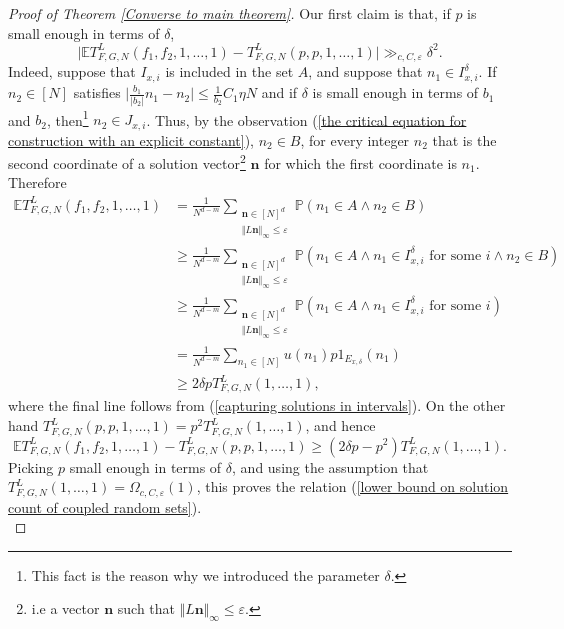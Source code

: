 \documentclass[12pt,a4paper,twoside,reqno]{amsart}
\numberwithin{equation}{section}
\begin{document}
\begin{proof}[Proof of Theorem \ref{Converse to main theorem}]
Our first claim is that, if $p$ is small enough in terms of $\delta$, 
\begin{equation}
\label{lower bound on solution count of coupled random sets}
\vert \mathbb{E} T_{F,G,N}^L(f_1,f_2,1,\dots,1)-T_{F,G,N}^L(p,p,1,\dots,1)\vert \gg_{c,C,\varepsilon} \delta^2.
\end{equation} Indeed, suppose that $I_{x,i}$ is included in the set $A$, and suppose that $n_1\in I_{x,i}^\delta$. If $n_2\in [N]$ satisfies $\vert \frac{b_1}{\vert b_2\vert} n_1 - n_2\vert \leqslant \frac{1}{b_2}C_1\eta N$ and if $\delta$ is small enough in terms of $b_1$ and $b_2$, then\footnote{This fact is the reason why we introduced the parameter $\delta$.} $n_2 \in J_{x,i}$. Thus, by the observation (\ref{the critical equation for construction with an explicit constant}), $n_2 \in B$, for every integer $n_2$ that is the second coordinate of a solution vector\footnote{i.e a vector $\mathbf{n}$ such that $\Vert L\mathbf{n}\Vert_\infty \leqslant \varepsilon$.} $\mathbf{n}$ for which the first coordinate is $n_1$. Therefore
\begin{align*}
\mathbb{E}T_{F,G,N}^L(f_1,f_2,1,\dots,1)& = \frac{1}{N^{d-m}}\sum\limits_{\substack{\mathbf{n}\in [N]^d \\ \Vert L\mathbf{n}\Vert_{\infty} \leqslant\varepsilon}} \mathbb{P}(n_1\in A\wedge n_2\in B)\\
&\geqslant \frac{1}{N^{d-m}}\sum\limits_{\substack{\mathbf{n}\in [N]^d \\ \Vert L\mathbf{n}\Vert_{\infty} \leqslant \varepsilon}} \mathbb{P}(n_1\in A \wedge n_1 \in I_{x,i}^\delta \text{ for some } i \wedge n_2\in B)\\
&\geqslant \frac{1}{N^{d-m}}\sum\limits_{\substack{\mathbf{n}\in [N]^d \\ \Vert L\mathbf{n}\Vert_{\infty} \leqslant \varepsilon}} \mathbb{P}(n_1\in A \wedge n_1 \in I_{x,i}^\delta \text{ for some } i)\\
& = \frac{1}{N^{d-m}}\sum\limits_{n_1\in [N] } u(n_1)p1_{E_{x,\delta}}
(n_1)\\
&\geqslant 2\delta p  T_{F,G,N}^L(1,\dots,1),
\end{align*}
\noindent where the final line follows from (\ref{capturing solutions in intervals}). On the other hand $T_{F,G,N}^L(p,p,1,\dots,1) = p^2T_{F,G,N}^L(1,\dots,1)$, and hence 
\begin{equation}
\mathbb{E} T_{F,G,N}^L(f_1,f_2,1,\dots,1)-T_{F,G,N}^L(p,p,1,\dots,1)\geqslant (2\delta p - p^2)T_{F,G,N}^L(1,\dots,1).
\end{equation}
Picking $p$ small enough in terms of $\delta$, and using the assumption that $T_{F,G,N}^L(1,\dots,1)  = \Omega_{c,C,\varepsilon}(1)$, this proves the relation (\ref{lower bound on solution count of coupled random sets}). \\


\end{proof}
\end{document}

